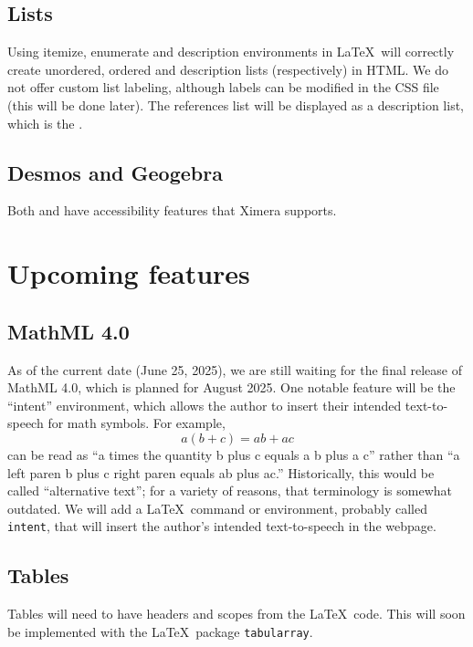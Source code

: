 \documentclass{ximera}
\begin{document}
\subsection{Lists}
Using itemize, enumerate and description environments in \LaTeX\ will correctly create unordered, ordered and description lists (respectively) in HTML. We do not offer custom list labeling, although
labels can be modified in the CSS file (this will be done later). The references list will be displayed as a description list, which is the .

\subsection{Desmos and Geogebra}
Both  and  have accessibility features that Ximera supports.


\section{Upcoming features}

\subsection{MathML 4.0}
As of the current date (June 25, 2025), we are still waiting for the final release of MathML 4.0, which is planned for August 2025.
One notable feature will be the ``intent'' environment, which allows the author to insert their intended text-to-speech for
math symbols. For example, 
\[
a(b+c) = ab + ac
\]
can be read as ``a times the quantity b plus c equals a b plus a c'' rather than ``a left paren b plus c right paren equals ab plus ac.''
Historically, this would be called ``alternative text''; for a variety of reasons, that terminology is somewhat outdated. 
We will add a \LaTeX\ command or environment, probably called \verb!intent!, that will insert the author's intended text-to-speech in the
webpage. 

\subsection{Tables}
Tables will need to have headers and scopes from the \LaTeX\ code. This will soon be implemented with the \LaTeX\ package \verb!tabularray!. 
\end{document}
